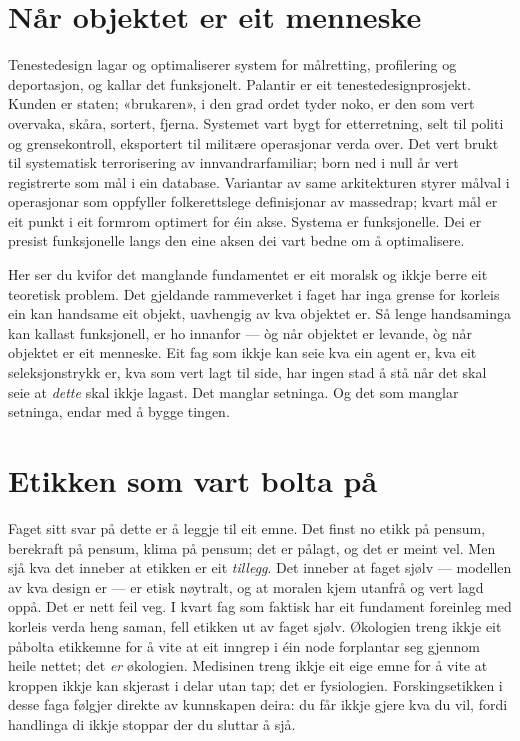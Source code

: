 \section{Når objektet er eit menneske}

Tenestedesign lagar og optimaliserer system for målretting, profilering og deportasjon, og kallar det funksjonelt. Palantir er eit tenestedesignprosjekt. Kunden er staten; «brukaren», i den grad ordet tyder noko, er den som vert overvaka, skåra, sortert, fjerna. Systemet vart bygt for etterretning, selt til politi og grensekontroll, eksportert til militære operasjonar verda over. Det vert brukt til systematisk terrorisering av innvandrarfamiliar; born ned i null år vert registrerte som mål i ein database. Variantar av same arkitekturen styrer målval i operasjonar som oppfyller folkerettslege definisjonar av massedrap; kvart mål er eit punkt i eit formrom optimert for éin akse. Systema er funksjonelle. Dei er presist funksjonelle langs den eine aksen dei vart bedne om å optimalisere.

Her ser du kvifor det manglande fundamentet er eit moralsk og ikkje berre eit teoretisk problem. Det gjeldande rammeverket i faget har inga grense for korleis ein kan handsame eit objekt, uavhengig av kva objektet er. Så lenge handsaminga kan kallast funksjonell, er ho innanfor — òg når objektet er levande, òg når objektet er eit menneske. Eit fag som ikkje kan seie kva ein agent er, kva eit seleksjonstrykk er, kva som vert lagt til side, har ingen stad å stå når det skal seie at \emph{dette} skal ikkje lagast. Det manglar setninga. Og det som manglar setninga, endar med å bygge tingen.

\section{Etikken som vart bolta på}

Faget sitt svar på dette er å leggje til eit emne. Det finst no etikk på pensum, berekraft på pensum, klima på pensum; det er pålagt, og det er meint vel. Men sjå kva det inneber at etikken er eit \emph{tillegg}. Det inneber at faget sjølv — modellen av kva design er — er etisk nøytralt, og at moralen kjem utanfrå og vert lagd oppå. Det er nett feil veg. I kvart fag som faktisk har eit fundament foreinleg med korleis verda heng saman, fell etikken ut av faget sjølv. Økologien treng ikkje eit påbolta etikkemne for å vite at eit inngrep i éin node forplantar seg gjennom heile nettet; det \emph{er} økologien. Medisinen treng ikkje eit eige emne for å vite at kroppen ikkje kan skjerast i delar utan tap; det er fysiologien. Forskingsetikken i desse faga følgjer direkte av kunnskapen deira: du får ikkje gjere kva du vil, fordi handlinga di ikkje stoppar der du sluttar å sjå.

